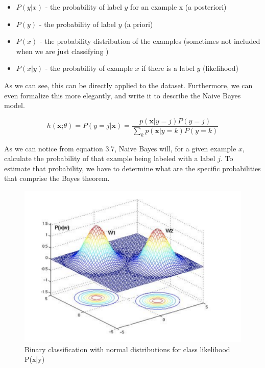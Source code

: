 \documentclass[times, utf8, seminar]{fer}
\begin{document}
\begin{itemize}
	\item $P(y|x)$ - the probability of label $y$ for an example x (a posteriori)
    \item $P(y)$ - the probability of label $y$ (a priori)
    \item $P(x)$ - the probability distribution of the examples (sometimes not included when we are just classifying )
	\item $P(x|y)$ - the probability of example $x$ if there is a label $y$ (likelihood)
\end{itemize}

As we can see, this can be directly applied to the dataset. Furthermore, we can even formalize this more elegantly, and write it to describe the Naive Bayes model.

\begin{equation}
h(\textbf{x;}\theta) = P(y = j | \textbf{x}) = \frac{ p(\textbf{x}| y = j) P(y = j)}{ \sum_{k} p(\textbf{x} | y = k ) P(y = k)}
\end{equation} \newline

As we can notice from equation 3.7, Naive Bayes will, for a given example $x$, calculate the probability of that example being labeled with a label $j$. To estimate that probability, we have to determine what are the specific probabilities that comprise the Bayes theorem.

\begin{figure}[h]
	\centering
	\includegraphics[width=12cm]{bayes}
	\caption{Binary classification with normal distributions for class likelihood P(x|y) \protect \footnotemark}
\end{figure}
\end{document}
